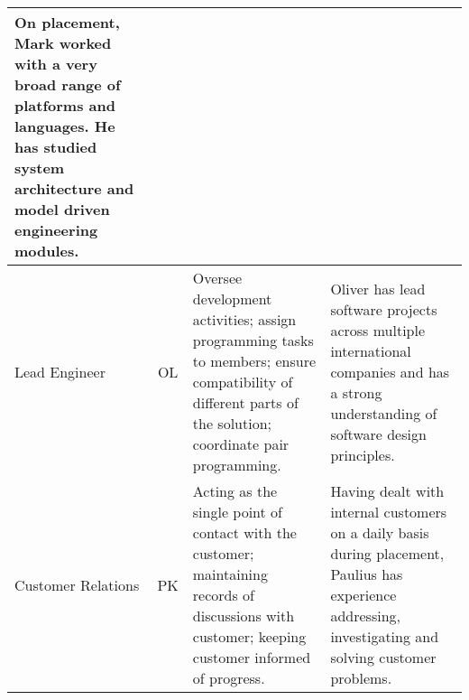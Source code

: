 \begin{table*}[h!]
\begin{tabularx}{\textwidth}{|p{2cm}|c|Y|Y|}
        On placement, Mark worked with a very broad range of platforms and languages. He has studied system architecture and model driven engineering modules.\\
        \hline
        Lead Engineer & 
        OL & 
        Oversee development activities; assign programming tasks to members; ensure compatibility of different parts of the solution; coordinate pair programming. & 
        Oliver has lead software projects across multiple international companies and has a strong understanding of software design principles.\\
        \hline
        Customer Relations & 
        PK & 
        Acting as the single point of contact with the customer; maintaining records of discussions with customer; keeping customer informed of progress. & 
        Having dealt with internal customers on a daily basis during placement, Paulius has experience addressing, investigating and solving customer problems. \\
        \hline
        \end{tabularx}
    \end{table*}